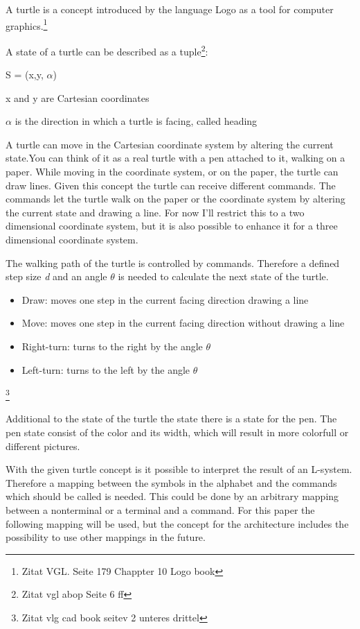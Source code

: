 \documentclass[english]{cpp-hmwk}
\begin{document}
\noindent A turtle is a concept introduced by the language Logo as a tool for computer graphics.\footnote{Zitat VGL. Seite 179 Chappter 10 Logo book}

\noindent A state of a turtle can be described as a tuple\footnote{Zitat vgl abop Seite 6 ff}:

\begin{center}
S = (x,y, $\alpha$)
\end{center}

x and y are Cartesian coordinates

$\alpha$ is the direction in which a turtle is facing, called heading

\medskip

\noindent A turtle can move in the Cartesian coordinate system by altering the current state.You can think of it as a real turtle with a pen attached to it, walking on a paper. While moving in the coordinate system, or on the paper, the turtle can draw lines. Given this concept the turtle can receive different commands. The commands let the turtle walk on the paper or the coordinate system by altering the current state and drawing a line. For now I'll restrict this to a two dimensional coordinate system, but it is also possible to enhance it for a three dimensional coordinate system.

\medskip

\noindent The walking path of the turtle is controlled by commands. Therefore a defined step size \textit{d} and an angle \textit{$\theta$ } is needed to calculate the next state of the turtle.

\begin{itemize}
\item Draw: moves one step in the current facing direction drawing a line 
\item Move: moves one step in the current facing direction without drawing a line
\item Right-turn: turns to the right by the angle $\theta$
\item Left-turn: turns to the left by the angle $\theta$
\end{itemize}
\footnote{Zitat vlg cad book seitev 2 unteres drittel}

\noindent Additional to the state of the turtle the state there is a state for the pen. The pen state consist of the color and its width, which will result in more colorfull or different pictures.

\medskip

\noindent  With the given turtle concept is it possible to interpret the result of an L-system. Therefore a mapping between the symbols in the alphabet and the commands which should be called is needed.
This could be done by an arbitrary mapping between a nonterminal or a terminal and a command. For this paper the following mapping will be used, but the concept for the architecture includes the possibility to use other mappings in the future.
\end{document}
